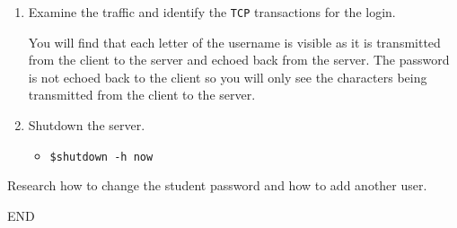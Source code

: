 \documentclass[11pt]{article}
\begin{document}
\begin{enumerate}
    \item Examine the traffic and identify the \texttt{TCP} transactions for the login.
        \begin{tcolorbox}[colback=blue!20]
            You will find that each letter of the username is visible as it is transmitted from the client to the server and echoed back from the server.
            The password is not echoed back to the client so you will only see the characters being transmitted from the client to the server.
        \end{tcolorbox}
    \item Shutdown the server.
        \begin{itemize}
            \item \texttt{\$shutdown -h now}
        \end{itemize}
    \end{enumerate}
    \begin{tcolorbox}[colback=blue!20,title={\textbf{TIME PERMITTING:}}]
        Research how to change the student password and how to add another user.
    \end{tcolorbox}
END
\end{document}
